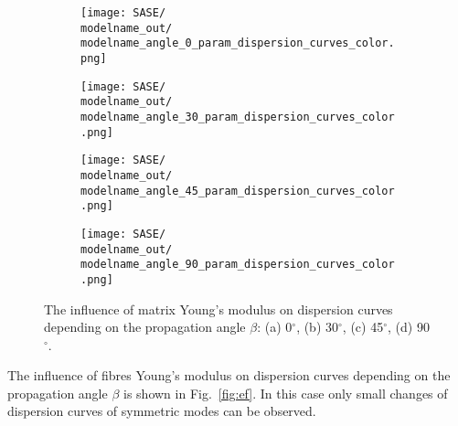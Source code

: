 \documentclass[preprint,12pt]{elsarticle}
\begin{document}
\begin{figure} [h!]
	\centering
	\newcommand{\modelname}{SASE4}
	\begin{subfigure}[b]{0.49\textwidth}
		\centering
		\texttt{[image: SASE/\\modelname\_out/\\modelname\_angle\_0\_param\_dispersion\_curves\_color.png]}
		\caption{}
		\label{fig:em0}
	\end{subfigure}
	\hfill
	\begin{subfigure}[b]{0.49\textwidth}
		\centering
		\texttt{[image: SASE/\\modelname\_out/\\modelname\_angle\_30\_param\_dispersion\_curves\_color.png]}
		\caption{}
		\label{fig:em30}
	\end{subfigure}
	\begin{subfigure}[b]{0.49\textwidth}
		\centering
		\texttt{[image: SASE/\\modelname\_out/\\modelname\_angle\_45\_param\_dispersion\_curves\_color.png]}
		\caption{}
		\label{fig:em45}
	\end{subfigure}
	\hfill
	\begin{subfigure}[b]{0.49\textwidth}
		\centering
		\texttt{[image: SASE/\\modelname\_out/\\modelname\_angle\_90\_param\_dispersion\_curves\_color.png]}
		\caption{}
		\label{fig:em90}
	\end{subfigure}
	\caption{The influence of matrix Young's modulus on dispersion curves depending on the propagation angle $\beta$: (a) 0$^{\circ}$, (b) 30$^{\circ}$, (c) 45$^{\circ}$, (d) 90$^{\circ}$.} 
	\label{fig:em}
\end{figure}
\clearpage

The influence of fibres Young's modulus on dispersion curves depending on the propagation angle $\beta$ is shown in Fig.~\ref{fig:ef}. In this case only small changes of dispersion curves of symmetric modes can be observed. 
\end{document}
